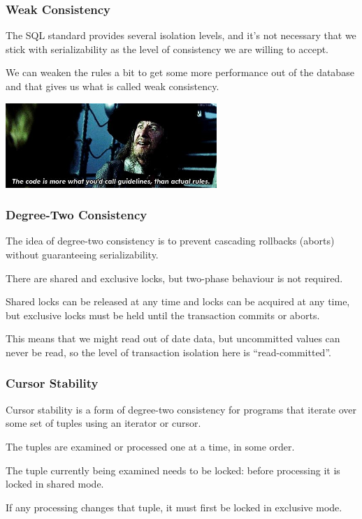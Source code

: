 \begin{frame}
\frametitle{Weak Consistency}

The SQL standard provides several isolation levels, and it's not necessary that we stick with serializability as the level of consistency we are willing to accept. 

We can weaken the rules a bit to get some more performance out of the database and that gives us what is called \alert{weak consistency}. 

\begin{center}
	\includegraphics[width=0.6\textwidth]{images/barbosa.jpg}
\end{center}

\end{frame}

\begin{frame}
\frametitle{Degree-Two Consistency}

The idea of \alert{degree-two consistency} is to prevent cascading rollbacks (aborts) without guaranteeing serializability. 

There are shared and exclusive locks, but two-phase behaviour is not required. 

Shared locks can be released at any time and locks can be acquired at any time, but exclusive locks must be held until the transaction commits or aborts. 

This means that we might read out of date data, but uncommitted values can never be read, so the level of transaction isolation here is ``read-committed''.
 
\end{frame}

\begin{frame}
\frametitle{Cursor Stability}

Cursor stability is a form of degree-two consistency for programs that iterate over some set of tuples using an iterator or cursor. 

The tuples are examined or processed one at a time, in some order. 

The tuple currently being examined needs to be locked: before processing it is locked in shared mode. 

If any processing changes that tuple, it must first be locked in exclusive mode. 

\end{frame}

